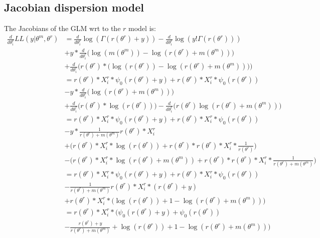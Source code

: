 \documentclass[bibliography=totoc,10pt]{scrartcl}
\begin{document}
\subsection{Jacobian dispersion model}
The Jacobians of the GLM wrt to the $r$ model is:
\begin{equation}
\begin{split}
\frac{d}{d \theta^r_i} LL(y|\theta^m, \theta^r) &= \frac{d}{d \theta^r_i} \log(\Gamma(r(\theta^r)+y)) - \frac{d}{d \theta^r_i} \log(y! \Gamma(r(\theta^r))) \\
&+ y * \frac{d}{d \theta^r_i} \bigg( \log(m(\theta^m)) -\log(r(\theta^r)+m(\theta^m)) \bigg) \\
&+ \frac{d}{d \theta^r_i} \bigg( r(\theta^r) * \bigg( \log(r(\theta^r)) - \log(r(\theta^r)+m(\theta^m)) \bigg) \bigg) \\
&= r(\theta^r) * X^r_{i} * \psi_0(r(\theta^r)+y)+ r(\theta^r) * X^r_{i} * \psi_0(r(\theta^r)) \\
&- y*\frac{d}{d \theta^r_i} \bigg( \log(r(\theta^r)+m(\theta^m)) \bigg) \\
&+ \frac{d}{d \theta^r_i} \bigg( r(\theta^r)*\log(r(\theta^r)) \bigg) - \frac{d}{d \theta^r_i} \bigg( r(\theta^r) \log(r(\theta^r)+m(\theta^m)) \bigg) \\
&= r(\theta^r) * X^r_{i} * \psi_0(r(\theta^r)+y)+ r(\theta^r) * X^r_{i} * \psi_0(r(\theta^r)) \\
&- y*\frac{1}{r(\theta^r)+m(\theta^m)} r(\theta^r) * X^r_{i}   \\
&+  \bigg( r(\theta^r) * X^r_{i}  * \log(r(\theta^r)) + r(\theta^r) * r(\theta^r) * X^r_{i}  * \frac{1}{r(\theta^r)} \bigg) \\
&- \bigg(r(\theta^r) * X^r_{i}  * \log(r(\theta^r)+m(\theta^m)) +  r(\theta^r) * r(\theta^r) * X^r_{i}  * \frac{1}{r(\theta^r)+m(\theta^m)} \bigg) \\
&= r(\theta^r) * X^r_{i} * \psi_0(r(\theta^r)+y)+ r(\theta^r) * X^r_{i} * \psi_0(r(\theta^r)) \\
&- \frac{1}{r(\theta^r)+m(\theta^m)} r(\theta^r) * X^r_{i}  *(r(\theta^r) + y) \\
&+ r(\theta^r) * X^r_{i}  * \bigg( \log(r(\theta^r)) + 1 - \log(r(\theta^r)+m(\theta^m)) \bigg)  \\
&= r(\theta^r) * X^r_{i} * \bigg( \psi_0(r(\theta^r)+y)+\psi_0(r(\theta^r)) \\
&- \frac{r(\theta^r) + y}{r(\theta^r)+m(\theta^m)} + \log(r(\theta^r)) + 1 - \log(r(\theta^r)+m(\theta^m)) \bigg)  \\
\end{split}
\end{equation}
\end{document}
